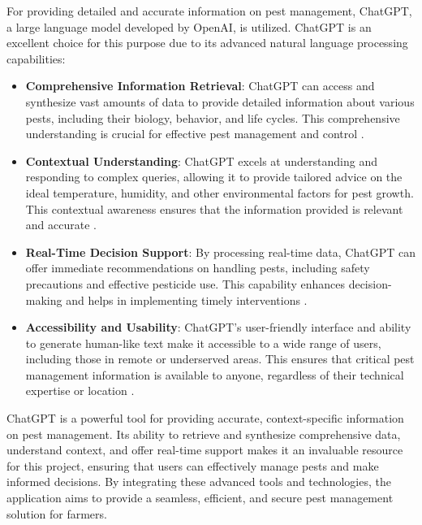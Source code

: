 For providing detailed and accurate information on pest management, ChatGPT, a large language model developed by OpenAI, is utilized. ChatGPT is an excellent choice for this purpose due to its advanced natural language processing capabilities:\cite{ray_2023_chatgpt}

\begin{itemize}
\item \textbf{Comprehensive Information Retrieval}: ChatGPT can access and synthesize vast amounts of data to provide detailed information about various pests, including their biology, behavior, and life cycles. This comprehensive understanding is crucial for effective pest management and control .
\item \textbf{Contextual Understanding}: ChatGPT excels at understanding and responding to complex queries, allowing it to provide tailored advice on the ideal temperature, humidity, and other environmental factors for pest growth. This contextual awareness ensures that the information provided is relevant and accurate .
\item \textbf{Real-Time Decision Support}: By processing real-time data, ChatGPT can offer immediate recommendations on handling pests, including safety precautions and effective pesticide use. This capability enhances decision-making and helps in implementing timely interventions .
\item \textbf{Accessibility and Usability}: ChatGPT’s user-friendly interface and ability to generate human-like text make it accessible to a wide range of users, including those in remote or underserved areas. This ensures that critical pest management information is available to anyone, regardless of their technical expertise or location .
\end{itemize}
ChatGPT is a powerful tool for providing accurate, context-specific information on pest management. Its ability to retrieve and synthesize comprehensive data, understand context, and offer real-time support makes it an invaluable resource for this project, ensuring that users can effectively manage pests and make informed decisions. By integrating these advanced tools and technologies, the application aims to provide a seamless, efficient, and secure pest management solution for farmers. 
